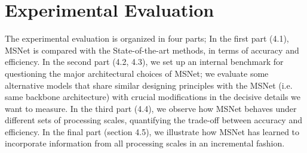 \documentclass[runningheads]{llncs}
\begin{document}
\begin{table}
    \centering
    \caption{Description of CNN architectures}
    \label{tab:learnable_models}
\end{table}

\section{Experimental Evaluation}

The experimental evaluation is organized in four parts; In the first part (4.1), MSNet is compared with the State-of-the-art methods, in terms of accuracy and efficiency. In the second part (4.2, 4.3), we set up an internal benchmark for questioning the major architectural choices of MSNet; we evaluate some alternative models that share similar designing principles with the MSNet (i.e. same backbone architecture) with crucial modifications in the decisive details we want to measure. In the third part (4.4), we observe how MSNet behaves under different sets of processing scales, quantifying the trade-off between accuracy and efficiency. In the final part (section 4.5), we illustrate how MSNet has learned to incorporate information from all processing scales in an incremental fashion.
\end{document}
